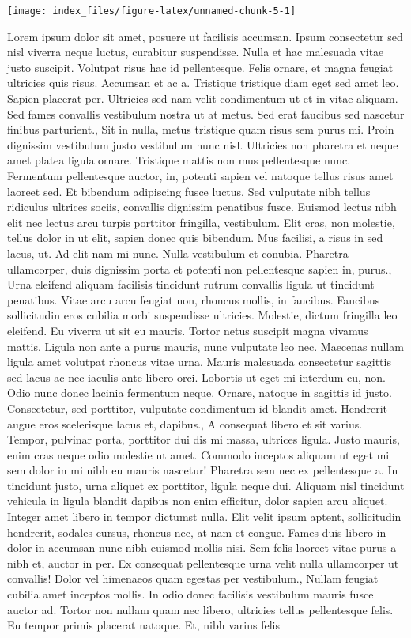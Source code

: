 \documentclass{source/tex/templates/maththesis}
\begin{document}
\begin{center}\texttt{[image: index\_files/figure-latex/unnamed-chunk-5-1]} \end{center}

Lorem ipsum dolor sit amet, posuere ut facilisis accumsan. Ipsum consectetur sed nisl viverra neque luctus, curabitur suspendisse. Nulla et hac malesuada vitae justo suscipit. Volutpat risus hac id pellentesque. Felis ornare, et magna feugiat ultricies quis risus. Accumsan et ac a. Tristique tristique diam eget sed amet leo. Sapien placerat per. Ultricies sed nam velit condimentum ut et in vitae aliquam. Sed fames convallis vestibulum nostra ut at metus. Sed erat faucibus sed nascetur finibus parturient., Sit in nulla, metus tristique quam risus sem purus mi. Proin dignissim vestibulum justo vestibulum nunc nisl. Ultricies non pharetra et neque amet platea ligula ornare. Tristique mattis non mus pellentesque nunc. Fermentum pellentesque auctor, in, potenti sapien vel natoque tellus risus amet laoreet sed. Et bibendum adipiscing fusce luctus. Sed vulputate nibh tellus ridiculus ultrices sociis, convallis dignissim penatibus fusce. Euismod lectus nibh elit nec lectus arcu turpis porttitor fringilla, vestibulum. Elit cras, non molestie, tellus dolor in ut elit, sapien donec quis bibendum. Mus facilisi, a risus in sed lacus, ut. Ad elit nam mi nunc. Nulla vestibulum et conubia. Pharetra ullamcorper, duis dignissim porta et potenti non pellentesque sapien in, purus., Urna eleifend aliquam facilisis tincidunt rutrum convallis ligula ut tincidunt penatibus. Vitae arcu arcu feugiat non, rhoncus mollis, in faucibus. Faucibus sollicitudin eros cubilia morbi suspendisse ultricies. Molestie, dictum fringilla leo eleifend. Eu viverra ut sit eu mauris. Tortor netus suscipit magna vivamus mattis. Ligula non ante a purus mauris, nunc vulputate leo nec. Maecenas nullam ligula amet volutpat rhoncus vitae urna. Mauris malesuada consectetur sagittis sed lacus ac nec iaculis ante libero orci. Lobortis ut eget mi interdum eu, non. Odio nunc donec lacinia fermentum neque. Ornare, natoque in sagittis id justo. Consectetur, sed porttitor, vulputate condimentum id blandit amet. Hendrerit augue eros scelerisque lacus et, dapibus., A consequat libero et sit varius. Tempor, pulvinar porta, porttitor dui dis mi massa, ultrices ligula. Justo mauris, enim cras neque odio molestie ut amet. Commodo inceptos aliquam ut eget mi sem dolor in mi nibh eu mauris nascetur! Pharetra sem nec ex pellentesque a. In tincidunt justo, urna aliquet ex porttitor, ligula neque dui. Aliquam nisl tincidunt vehicula in ligula blandit dapibus non enim efficitur, dolor sapien arcu aliquet. Integer amet libero in tempor dictumst nulla. Elit velit ipsum aptent, sollicitudin hendrerit, sodales cursus, rhoncus nec, at nam et congue. Fames duis libero in dolor in accumsan nunc nibh euismod mollis nisi. Sem felis laoreet vitae purus a nibh et, auctor in per. Ex consequat pellentesque urna velit nulla ullamcorper ut convallis! Dolor vel himenaeos quam egestas per vestibulum., Nullam feugiat cubilia amet inceptos mollis. In odio donec facilisis vestibulum mauris fusce auctor ad. Tortor non nullam quam nec libero, ultricies tellus pellentesque felis. Eu tempor primis placerat natoque. Et, nibh varius felis 
\end{document}
